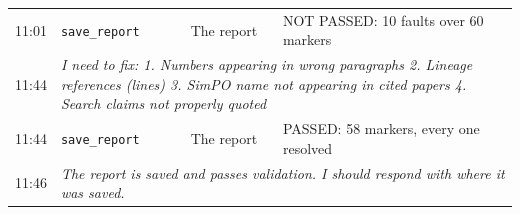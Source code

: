 \begin{table}[H]
\begin{tabular}{rlp{}p{}}
11:01 & \texttt{save\_report} & The report & NOT PASSED: 10 faults over 60 markers \\
11:44 & \multicolumn{3}{p{0.86\textwidth}}{\textit{I need to fix: 1. Numbers appearing in wrong paragraphs 2. Lineage references (lines) 3. SimPO name not appearing in cited papers 4. Search claims not properly quoted}} \\
11:44 & \texttt{save\_report} & The report & PASSED: 58 markers, every one resolved \\
11:46 & \multicolumn{3}{p{0.86\textwidth}}{\textit{The report is saved and passes validation. I should respond with where it was saved.}} \\
\bottomrule
\end{tabular}
\end{table}
